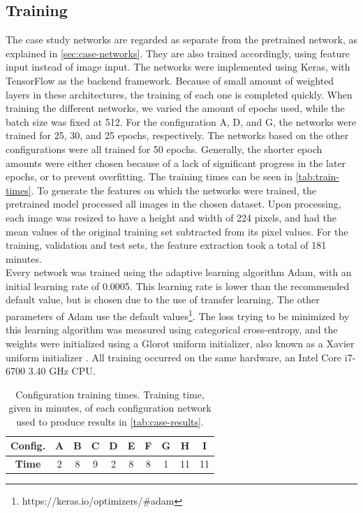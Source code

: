 \subsection{Training} \label{sec:case-training}

The case study networks are regarded as separate from the pretrained network, as explained in \autoref{sec:case-networks}. They are also trained accordingly, using feature input instead of image input. The networks were implemented using Keras, with TensorFlow as the backend framework. Because of small amount of weighted layers in these architectures, the training of each one is completed quickly. When training the different networks, we varied the amount of epochs used, while the batch size was fixed at 512. For the configuration A, D, and G, the networks were trained for 25, 30, and 25 epochs, respectively. The networks based on the other configurations were all trained for 50 epochs. Generally, the shorter epoch amounts were either chosen because of a lack of significant progress in the later epochs, or to prevent overfitting. The training times can be seen in \autoref{tab:train-times}. To generate the features on which the networks were trained, the pretrained model processed all images in the chosen dataset. Upon processing, each image was resized to have a height and width of 224 pixels, and had the mean values of the original training set subtracted from its pixel values. For the training, validation and test sets, the feature extraction took a total of 181 minutes. \\

\noindent Every network was trained using the adaptive learning algorithm Adam, with an initial learning rate of 0.0005. This learning rate is lower than the recommended default value, but is chosen due to the use of transfer learning. The other parameters of Adam use the default values\footnote{https://keras.io/optimizers/\#adam}. The loss trying to be minimized by this learning algorithm was measured using categorical cross-entropy, and the weights were initialized using a Glorot uniform initializer, also known as a Xavier uniform initializer \cite{glorot}. All training occurred on the same hardware, an Intel\textregistered{} Core\texttrademark{} i7-6700 3.40 GHz CPU. 

\begin{table}[h!]
\begin{center}
\begin{tabular}{|c|c|c|c|c|c|c|c|c|c|}
\hline
\textbf{Config.} & A & B & C & D & E & F & G & H & I \\ \hline
\textbf{Time} & 2 & 8 & 9 & 2 & 8 & 8 & 1 & 11 & 11 \\ \hline
\end{tabular}
\end{center}
\caption[Configuration training times]{Configuration training times. Training time, given in minutes, of each configuration network used to produce results in \autoref{tab:case-results}.}
\label{tab:train-times}
\end{table}


\cleardoublepage